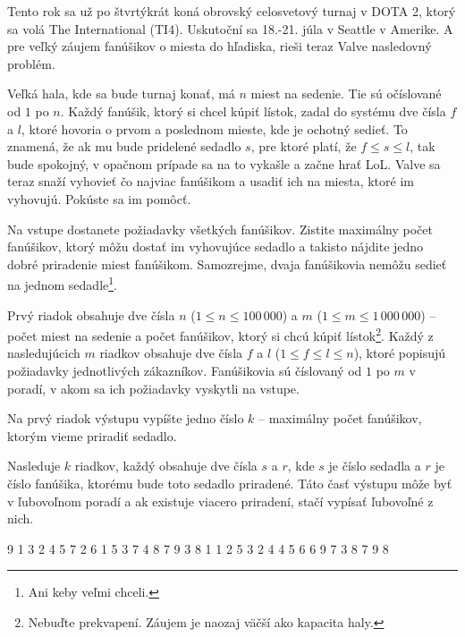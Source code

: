 





Tento rok sa už po štvrtýkrát koná obrovský celosvetový turnaj v DOTA 2, ktorý sa volá The
International (TI4). Uskutoční sa 18.-21. júla v Seattle v Amerike. A pre veľký záujem fanúšikov o
miesta do hľadiska, rieši teraz Valve nasledovný problém.

Veľká hala, kde sa bude turnaj konať, má $n$ miest na sedenie. Tie sú očíslované od $1$ po $n$. Každý
fanúšik, ktorý si chcel kúpiť lístok, zadal do systému dve čísla $f$ a $l$, ktoré hovoria o
prvom a poslednom mieste, kde je ochotný sedieť. To znamená, že ak mu bude pridelené sedadlo $s$,
pre ktoré platí, že $f \leq s \leq l$, tak bude spokojný, v opačnom prípade sa na to vykašle a začne
hrať LoL. Valve sa teraz snaží vyhovieť čo najviac fanúšikom a usadiť ich na miesta, ktoré im
vyhovujú. Pokúste sa im pomôcť.


Na vstupe dostanete požiadavky všetkých fanúšikov. Zistite maximálny počet fanúšikov, ktorý môžu
dostať im vyhovujúce sedadlo a takisto nájdite jedno dobré priradenie miest fanúšikom. Samozrejme,
dvaja fanúšikovia nemôžu sedieť na jednom sedadle\footnote{Ani keby veľmi chceli.}.


Prvý riadok obsahuje dve čísla $n$ ($1 \leq n \leq 100\,000$) a $m$ ($1 \leq m \leq 1\,000\,000$)
-- počet miest na sedenie a počet fanúšikov, ktorý si chcú kúpiť lístok\footnote{Nebuďte prekvapení.
Záujem je naozaj väčší ako kapacita haly.}. Každý z nasledujúcich $m$ riadkov obsahuje dve čísla $f$
a $l$ ($1 \leq f \leq l \leq n$), ktoré popisujú požiadavky jednotlivých zákazníkov. Fanúšikovia sú
číslovaný od $1$ po $m$ v poradí, v akom sa ich požiadavky vyskytli na vstupe.


Na prvý riadok výstupu vypíšte jedno číslo $k$ -- maximálny počet fanúšikov, ktorým vieme priradiť
sedadlo.

Nasleduje $k$ riadkov, každý obsahuje dve čísla $s$ a $r$, kde $s$ je číslo sedadla a $r$ je číslo
fanúšika, ktorému bude toto sedadlo priradené. Táto časť výstupu môže byť v ľubovoľnom poradí a ak
existuje viacero priradení, stačí vypísať ľubovoľné z nich.

 9
1 3
2 4
5 7
2 6
1 5
3 7
4 8
7 9
3 8
1 1
2 5
3 2
4 4
5 6
6 9
7 3
8 7
9 8
\sampleCOMMENT

\sampleEND
\bigskip


